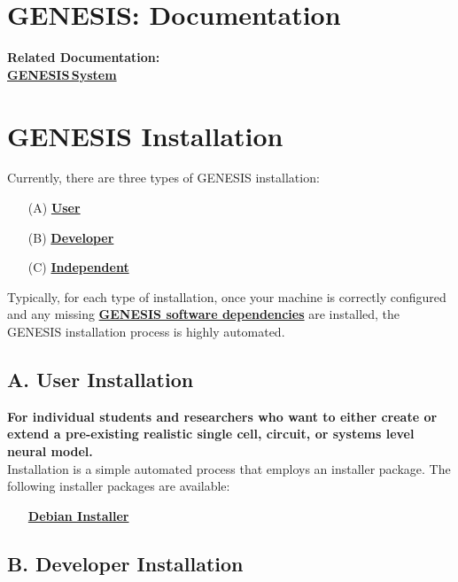 \documentclass[12pt]{article}
\begin{document}
\section*{GENESIS: Documentation}

{\bf Related Documentation:} \\
\href{../genesis-system/genesis-system.tex}{\bf GENESIS\,System}

\section*{GENESIS  Installation}

Currently, there are three types of GENESIS installation:
\begin{itemize}
   \item[(A)]\href{../installation-debian/installation-debian.tex}{\bf User}
   \item[(B)]\href{../installation-developer/installation-developer.tex}{\bf Developer}
   \item[(C)]\href{../installation-independent/installation-independent.tex}{\bf Independent}
\end{itemize}
Typically, for each type of installation, once your machine is correctly configured and any missing \href{../genesis-dependencies/genesis-dependencies.tex}{\bf GENESIS software dependencies} are installed, the GENESIS installation process is highly automated.

\subsection*{A. User Installation}

{\bf For individual students and researchers who want to either create or extend a pre-existing realistic single cell, circuit, or systems level neural model.} \\
Installation is a simple automated process that employs an installer package. The following installer packages are available:
\begin{itemize}
   \item[] \href{../installation-debian/installation-debian.tex}{\bf Debian Installer}
\end{itemize}
   
\subsection*{B. Developer Installation}
\end{document}
